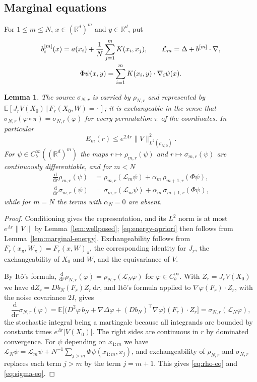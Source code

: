 \documentclass[11pt]{amsart}
\numberwithin{equation}{section}
\theoremstyle{plain}
\newtheorem{lemma}[theorem]{Lemma}
\theoremstyle{remark}
\newcommand{\R}{\mathbb{R}}
\newcommand{\E}{\mathbb{E}}
\newcommand{\cL}{\mathcal{L}}
\newcommand{\dd}{\mathrm{d}}
\begin{document}
\subsection{Marginal equations}
For $1\le m\le N$, $x\in(\R^d)^m$ and $y\in\R^d$, put
\begin{gather}
b^{[m]}_i(x)=a(x_i)+\frac1N\sum_{j=1}^mK(x_i,x_j),\qquad \cL_m=\Delta+b^{[m]}\cdot\nabla,\label{eq:Bm-Phi}\\
\Phi\psi(x,y)=\sum_{i=1}^mK(x_i,y)\cdot\nabla_i\psi(x).\notag
\end{gather}

\begin{lemma}\label{lem:propagated}
The source $\sigma_{N,r}$ is carried by $\rho_{N,r}$ and represented by $\E[J_rV(X_0)\,|\,F_r(X_0,W)=\cdot\,]$; it is exchangeable in the sense that $\sigma_{N,r}(\varphi\circ\pi)=\sigma_{N,r}(\varphi)$ for every permutation $\pi$ of the coordinates. In particular
\begin{equation}\label{eq:energy-apriori}
E_m(r)\le e^{2\Lambda r}\|V\|^2_{L^2(\rho_{N,0})}.
\end{equation}
For $\psi\in C^\infty_b((\R^d)^m)$ the maps $r\mapsto\rho_{m,r}(\psi)$ and $r\mapsto\sigma_{m,r}(\psi)$ are continuously differentiable, and for $m<N$
\begin{align}
\frac{\dd}{\dd r}\rho_{m,r}(\psi)&=\rho_{m,r}(\cL_m\psi)+\alpha_m\,\rho_{m+1,r}(\Phi\psi),\label{eq:rho-eq}\\
\frac{\dd}{\dd r}\sigma_{m,r}(\psi)&=\sigma_{m,r}(\cL_m\psi)+\alpha_m\,\sigma_{m+1,r}(\Phi\psi),\label{eq:sigma-eq}
\end{align}
while for $m=N$ the terms with $\alpha_N=0$ are absent.
\end{lemma}

\begin{proof}
Conditioning gives the representation, and its $L^2$ norm is at most $e^{\Lambda r}\|V\|$ by Lemma~\ref{lem:wellposed}; \eqref{eq:energy-apriori} then follows from Lemma~\ref{lem:marginal-energy}. Exchangeability follows from $F_r(x_\pi,W_\pi)=F_r(x,W)_\pi$, the corresponding identity for $J_r$, the exchangeability of $X_0$ and $W$, and the equivariance of $V$.

By It\^o's formula, $\frac{\dd}{\dd r}\rho_{N,r}(\varphi)=\rho_{N,r}(\cL_N\varphi)$ for $\varphi\in C^\infty_b$. With $Z_r=J_rV(X_0)$ we have $\dd Z_r=Db_N(F_r)Z_r\,\dd r$, and It\^o's formula applied to $\nabla\varphi(F_r)\cdot Z_r$, with the noise covariance $2I$, gives
\[
\frac{\dd}{\dd r}\sigma_{N,r}(\varphi)=\E\big[\big(D^2\varphi\,b_N+\nabla\Delta\varphi+(Db_N)^{\top}\nabla\varphi\big)(F_r)\cdot Z_r\big]=\sigma_{N,r}(\cL_N\varphi),
\]
the stochastic integral being a martingale because all integrands are bounded by constants times $e^{\Lambda r}|V(X_0)|$. The right sides are continuous in $r$ by dominated convergence. For $\psi$ depending on $x_{1:m}$ we have $\cL_N\psi=\cL_m\psi+N^{-1}\sum_{j>m}\Phi\psi(x_{1:m},x_j)$, and exchangeability of $\rho_{N,r}$ and $\sigma_{N,r}$ replaces each term $j>m$ by the term $j=m+1$. This gives \eqref{eq:rho-eq} and \eqref{eq:sigma-eq}.
\end{proof}
\end{document}

